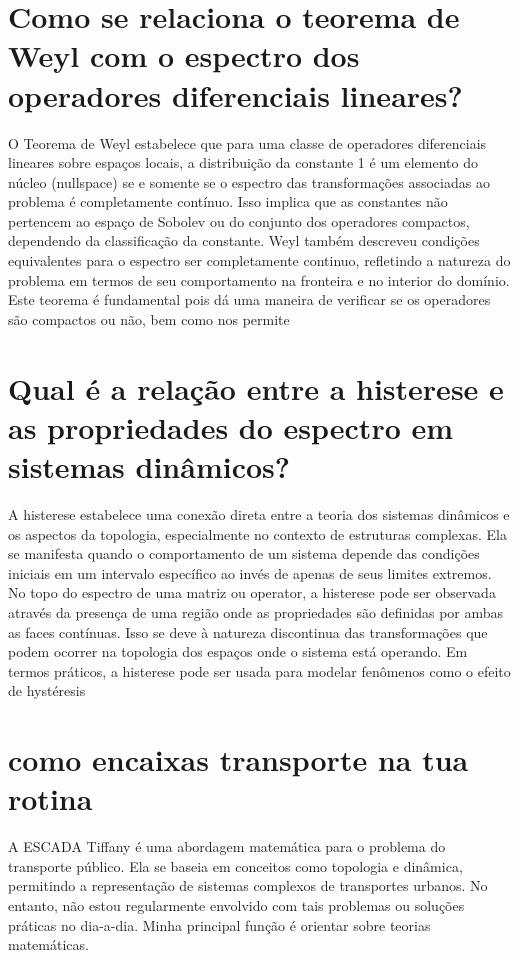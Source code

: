 \documentclass[11pt,a4paper]{article}
\begin{document}
\section{Como se relaciona o teorema de Weyl com o espectro dos operadores diferenciais lineares?}
O Teorema de Weyl estabelece que para uma classe de operadores diferenciais lineares sobre espaços locais, a distribuição da constante 1 é um elemento do núcleo (nullspace) se e somente se o espectro das transformações associadas ao problema é completamente contínuo. Isso implica que as constantes não pertencem ao espaço de Sobolev ou do conjunto dos operadores compactos, dependendo da classificação da constante. Weyl também descreveu condições equivalentes para o espectro ser completamente continuo, refletindo a natureza do problema em termos de seu comportamento na fronteira e no interior do domínio. Este teorema é fundamental pois dá uma maneira de verificar se os operadores são compactos ou não, bem como nos permite

\section{Qual é a relação entre a histerese e as propriedades do espectro em sistemas dinâmicos?}
A histerese estabelece uma conexão direta entre a teoria dos sistemas dinâmicos e os aspectos da topologia, especialmente no contexto de estruturas complexas. Ela se manifesta quando o comportamento de um sistema depende das condições iniciais em um intervalo específico ao invés de apenas de seus limites extremos. No topo do espectro de uma matriz ou operator, a histerese pode ser observada através da presença de uma região onde as propriedades são definidas por ambas as faces contínuas. Isso se deve à natureza discontinua das transformações que podem ocorrer na topologia dos espaços onde o sistema está operando. Em termos práticos, a histerese pode ser usada para modelar fenômenos como o efeito de hystéresis

\section{como encaixas transporte na tua rotina}
A ESCADA Tiffany é uma abordagem matemática para o problema do transporte público. Ela se baseia em conceitos como topologia e dinâmica, permitindo a representação de sistemas complexos de transportes urbanos. No entanto, não estou regularmente envolvido com tais problemas ou soluções práticas no dia-a-dia. Minha principal função é orientar sobre teorias matemáticas.
\end{document}
